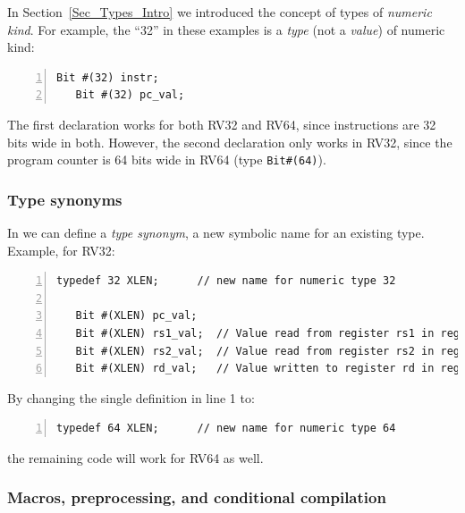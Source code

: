 In Section~\ref{Sec_Types_Intro} we introduced the concept of types of
\emph{numeric kind}. For example, the ``32'' in these examples is a
\emph{type} (not a \emph{value}) of numeric kind:

{\footnotesize
\begin{Verbatim}[frame=single, numbers=left]
   Bit #(32) instr;
   Bit #(32) pc_val;
\end{Verbatim}
}

The first declaration works for both RV32 and RV64, since instructions
are 32 bits wide in both.  However, the second declaration only works
in RV32, since the program counter is 64 bits wide in RV64 (type
\verb|Bit#(64)|).


\subsubsection{Type synonyms}


In {\BSV} we can define a \emph{type synonym}, a new symbolic name for
an existing type. Example, for RV32:

{\footnotesize
\begin{Verbatim}[frame=single, numbers=left]
   typedef 32 XLEN;      // new name for numeric type 32

   Bit #(XLEN) pc_val;
   Bit #(XLEN) rs1_val;  // Value read from register rs1 in register file
   Bit #(XLEN) rs2_val;  // Value read from register rs2 in register file
   Bit #(XLEN) rd_val;   // Value written to register rd in register file
\end{Verbatim}
}

By changing the single definition in line 1 to:

{\footnotesize
\begin{Verbatim}[frame=single, numbers=left]
   typedef 64 XLEN;      // new name for numeric type 64
\end{Verbatim}
}

the remaining code will work for RV64 as well.


\subsubsection{Macros, preprocessing, and conditional compilation}

